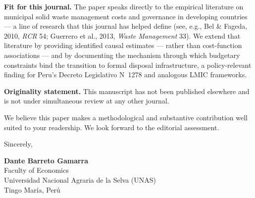 \documentclass[12pt]{article}
\begin{document}
\textbf{Fit for this journal.} The paper speaks directly to the empirical literature on municipal solid waste management costs and governance in developing countries --- a line of research that this journal has helped define (see, e.g., Bel \& Fageda, 2010, \textit{RCR} 54; Guerrero et al., 2013, \textit{Waste Management} 33). We extend that literature by providing identified causal estimates --- rather than cost-function associations --- and by documenting the mechanism through which budgetary constraints bind the transition to formal disposal infrastructure, a policy-relevant finding for Peru's Decreto Legislativo N\textdegree~1278 and analogous LMIC frameworks.

\textbf{Originality statement.} This manuscript has not been published elsewhere and is not under simultaneous review at any other journal.

We believe this paper makes a methodological and substantive contribution well suited to your readership. We look forward to the editorial assessment.

\medskip

Sincerely,

\bigskip\bigskip

\textbf{Dante Barreto Gamarra}\\
Faculty of Economics\\
Universidad Nacional Agraria de la Selva (UNAS)\\
Tingo Mar\'ia, Per\'u
\end{document}
